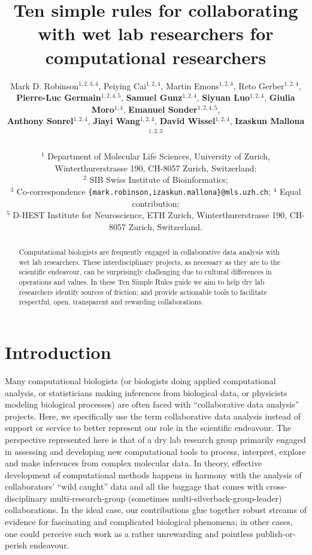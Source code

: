 \documentclass{article}
\title{Ten simple rules for collaborating with wet lab researchers for computational researchers}
\author{
Mark D. Robinson$^{1,2,3,4}$, 
Peiying Cai$^{1,2,4}$,
Martin Emons$^{1,2,4}$,
Reto Gerber$^{1,2,4}$,\\
\textbf{Pierre-Luc Germain$^{1,2,4,5}$},
\textbf{Samuel Gunz$^{1,2,4}$}, 
\textbf{Siyuan Luo$^{1,2,4}$},
\textbf{Giulia Moro$^{1,4}$},
\textbf{Emanuel Sonder$^{1,2,4,5}$},\\
\textbf{Anthony Sonrel$^{1,2,4}$},
\textbf{Jiayi Wang$^{1,2,4}$},
\textbf{David Wissel$^{1,2,4}$},
\textbf{Izaskun Mallona$^{1,2,3}$}\\ 
\\
$^1$ Department of Molecular Life Sciences, University of Zurich, Winterthurerstrasse 190, CH-8057 Zurich, Switzerland;\\ $^2$ SIB Swiss Institute of Bioinformatics;\\ $^3$ Co-correspondence \texttt{\{mark.robinson,izaskun.mallona\}@mls.uzh.ch}; $^4$ Equal contribution;\\
$^5$ D-HEST Institute for Neuroscience, ETH Zurich, Winterthurerstrasse 190, CH-8057 Zurich, Switzerland.\\ 
}
\begin{document}
\maketitle

\vspace{-0.5cm}

\begin{abstract}
Computational biologists are frequently engaged in collaborative data analysis with wet lab researchers. These interdisciplinary projects, as necessary as they are to the scientific endeavour, can be surprisingly challenging due to cultural differences in operations and values. In these Ten Simple Rules guide we aim to help dry lab researchers identify sources of friction; and provide actionable tools to facilitate respectful, open, transparent and rewarding collaborations.
\end{abstract}

\vspace{0.5cm}


\section*{Introduction} %

Many computational biologists (or biologists doing applied computational analysis, or statisticians making inferences from biological data, or physicists modeling biological processes) are often faced with ``collaborative data analysis'' projects. Here, we specifically use the term collaborative data analysis instead of support or service to better represent our role in the scientific endeavour. The perspective represented here is that of a dry lab research group primarily engaged in assessing and developing new computational tools to process, interpret, explore and make inferences from complex molecular data. In theory, effective development of computational methods happens in harmony with the analysis of collaborators’ ``wild caught'' data and all the baggage that comes with cross-disciplinary multi-research-group (sometimes multi-silverback-group-leader) collaborations. In the ideal case, our contributions glue together robust streams of evidence for fascinating and complicated biological phenomena; in other cases, one could perceive such work as a rather unrewarding and pointless publish-or-perish endeavour.
\end{document}
